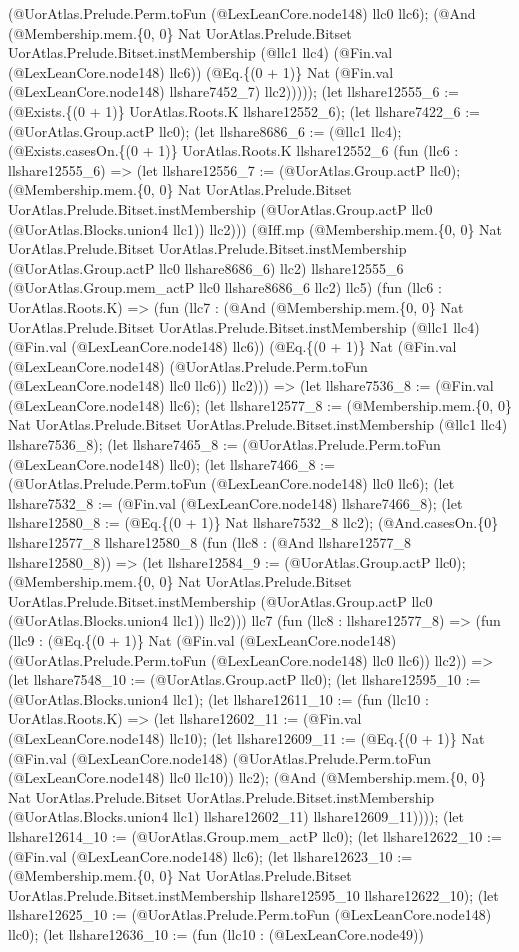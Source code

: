 \documentclass[11pt]{article}
\begin{document}
(@UorAtlas.Prelude.Perm.toFun (@LexLeanCore.node148) llc0 llc6); (@And (@Membership.mem.\{0, 0\} Nat UorAtlas.Prelude.Bitset UorAtlas.Prelude.Bitset.instMembership (@llc1 llc4) (@Fin.val (@LexLeanCore.node148) llc6)) (@Eq.\{(0 + 1)\} Nat (@Fin.val (@LexLeanCore.node148) llshare7452\_7) llc2))))); (let llshare12555\_6 := (@Exists.\{(0 + 1)\} UorAtlas.Roots.K llshare12552\_6); (let llshare7422\_6 := (@UorAtlas.Group.actP llc0); (let llshare8686\_6 := (@llc1 llc4); (@Exists.casesOn.\{(0 + 1)\} UorAtlas.Roots.K llshare12552\_6 (fun (llc6 : llshare12555\_6) => (let llshare12556\_7 := (@UorAtlas.Group.actP llc0); (@Membership.mem.\{0, 0\} Nat UorAtlas.Prelude.Bitset UorAtlas.Prelude.Bitset.instMembership (@UorAtlas.Group.actP llc0 (@UorAtlas.Blocks.union4 llc1)) llc2))) (@Iff.mp (@Membership.mem.\{0, 0\} Nat UorAtlas.Prelude.Bitset UorAtlas.Prelude.Bitset.instMembership (@UorAtlas.Group.actP llc0 llshare8686\_6) llc2) llshare12555\_6 (@UorAtlas.Group.mem\_actP llc0 llshare8686\_6 llc2) llc5) (fun (llc6 : UorAtlas.Roots.K) => (fun (llc7 : (@And (@Membership.mem.\{0, 0\} Nat UorAtlas.Prelude.Bitset UorAtlas.Prelude.Bitset.instMembership (@llc1 llc4) (@Fin.val (@LexLeanCore.node148) llc6)) (@Eq.\{(0 + 1)\} Nat (@Fin.val (@LexLeanCore.node148) (@UorAtlas.Prelude.Perm.toFun (@LexLeanCore.node148) llc0 llc6)) llc2))) => (let llshare7536\_8 := (@Fin.val (@LexLeanCore.node148) llc6); (let llshare12577\_8 := (@Membership.mem.\{0, 0\} Nat UorAtlas.Prelude.Bitset UorAtlas.Prelude.Bitset.instMembership (@llc1 llc4) llshare7536\_8); (let llshare7465\_8 := (@UorAtlas.Prelude.Perm.toFun (@LexLeanCore.node148) llc0); (let llshare7466\_8 := (@UorAtlas.Prelude.Perm.toFun (@LexLeanCore.node148) llc0 llc6); (let llshare7532\_8 := (@Fin.val (@LexLeanCore.node148) llshare7466\_8); (let llshare12580\_8 := (@Eq.\{(0 + 1)\} Nat llshare7532\_8 llc2); (@And.casesOn.\{0\} llshare12577\_8 llshare12580\_8 (fun (llc8 : (@And llshare12577\_8 llshare12580\_8)) => (let llshare12584\_9 := (@UorAtlas.Group.actP llc0); (@Membership.mem.\{0, 0\} Nat UorAtlas.Prelude.Bitset UorAtlas.Prelude.Bitset.instMembership (@UorAtlas.Group.actP llc0 (@UorAtlas.Blocks.union4 llc1)) llc2))) llc7 (fun (llc8 : llshare12577\_8) => (fun (llc9 : (@Eq.\{(0 + 1)\} Nat (@Fin.val (@LexLeanCore.node148) (@UorAtlas.Prelude.Perm.toFun (@LexLeanCore.node148) llc0 llc6)) llc2)) => (let llshare7548\_10 := (@UorAtlas.Group.actP llc0); (let llshare12595\_10 := (@UorAtlas.Blocks.union4 llc1); (let llshare12611\_10 := (fun (llc10 : UorAtlas.Roots.K) => (let llshare12602\_11 := (@Fin.val (@LexLeanCore.node148) llc10); (let llshare12609\_11 := (@Eq.\{(0 + 1)\} Nat (@Fin.val (@LexLeanCore.node148) (@UorAtlas.Prelude.Perm.toFun (@LexLeanCore.node148) llc0 llc10)) llc2); (@And (@Membership.mem.\{0, 0\} Nat UorAtlas.Prelude.Bitset UorAtlas.Prelude.Bitset.instMembership (@UorAtlas.Blocks.union4 llc1) llshare12602\_11) llshare12609\_11)))); (let llshare12614\_10 := (@UorAtlas.Group.mem\_actP llc0); (let llshare12622\_10 := (@Fin.val (@LexLeanCore.node148) llc6); (let llshare12623\_10 := (@Membership.mem.\{0, 0\} Nat UorAtlas.Prelude.Bitset UorAtlas.Prelude.Bitset.instMembership llshare12595\_10 llshare12622\_10); (let llshare12625\_10 := (@UorAtlas.Prelude.Perm.toFun (@LexLeanCore.node148) llc0); (let llshare12636\_10 := (fun (llc10 : (@LexLeanCore.node49)) 
\end{document}
